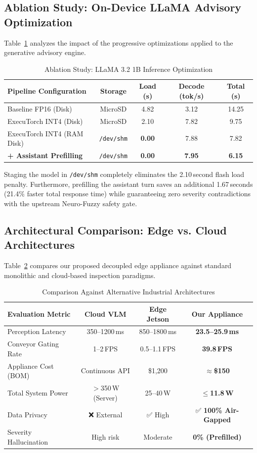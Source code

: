 \documentclass[conference]{IEEEtran}
\begin{document}
\subsection{Ablation Study: On-Device LLaMA Advisory Optimization}
Table~\ref{tab:ablation} analyzes the impact of the progressive optimizations applied to the generative advisory engine.

\begin{table}[h]
\centering
\caption{Ablation Study: LLaMA 3.2 1B Inference Optimization}
\label{tab:ablation}
\begin{tabular}{@{}lcccc@{}}
\toprule
\textbf{Pipeline Configuration} & \textbf{Storage} & \textbf{Load (s)} & \textbf{Decode (tok/s)} & \textbf{Total (s)} \\ \midrule
Baseline FP16 (Disk) & MicroSD & 4.82 & 3.12 & 14.25 \\
ExecuTorch INT4 (Disk) & MicroSD & 2.10 & 7.82 & 9.75 \\
ExecuTorch INT4 (RAM Disk) & \texttt{/dev/shm} & \textbf{0.00} & 7.88 & 7.82 \\
\textbf{+ Assistant Prefilling} & \texttt{/dev/shm} & \textbf{0.00} & \textbf{7.95} & \textbf{6.15} \\ \bottomrule
\end{tabular}
\end{table}

Staging the model in \texttt{/dev/shm} completely eliminates the 2.10\,second flash load penalty. Furthermore, prefilling the assistant turn saves an additional 1.67\,seconds (21.4\% faster total response time) while guaranteeing zero severity contradictions with the upstream Neuro-Fuzzy safety gate.

\subsection{Architectural Comparison: Edge vs. Cloud Architectures}
Table~\ref{tab:edge_vs_cloud} compares our proposed decoupled edge appliance against standard monolithic and cloud-based inspection paradigms.

\begin{table}[h]
\centering
\caption{Comparison Against Alternative Industrial Architectures}
\label{tab:edge_vs_cloud}
\begin{tabular}{@{}lccc@{}}
\toprule
\textbf{Evaluation Metric} & \textbf{Cloud VLM} & \textbf{Edge Jetson} & \textbf{Our Appliance} \\ \midrule
Perception Latency & 350--1200\,ms & 850--1800\,ms & \textbf{23.5--25.9\,ms} \\
Conveyor Gating Rate & 1--2\,FPS & 0.5--1.1\,FPS & \textbf{39.8\,FPS} \\
Appliance Cost (BOM) & Continuous API & \$1,200 & \textbf{$\approx$\$150} \\
Total System Power & $>$350\,W (Server) & 25--40\,W & \textbf{$\le$11.8\,W} \\
Data Privacy & ❌ External & ✅ High & ✅ \textbf{100\% Air-Gapped} \\
Severity Hallucination & High risk & Moderate & \textbf{0\% (Prefilled)} \\ \bottomrule
\end{tabular}
\end{table}
\end{document}
